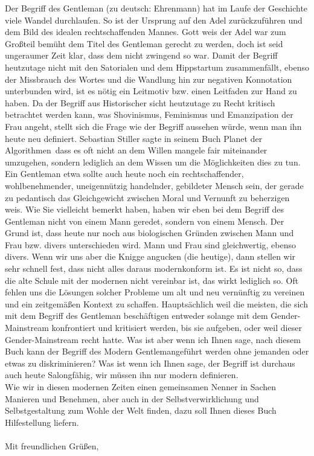 Der Begriff des Gentleman (zu deutsch: Ehrenmann) hat im Laufe der Geschichte viele Wandel durchlaufen. 
So ist der Ursprung auf den Adel zurückzuführen und dem Bild des idealen rechtschaffenden Mannes. 
Gott weis der Adel war zum Großteil bemüht dem Titel des Gentleman gerecht zu werden, doch ist seid ungeraumer Zeit klar, 
dass dem nicht zwingend so war. Damit der Begriff heutzutage nicht mit den Satorialen und dem Hippstartum zusammenfällt,
ebenso der Missbrauch des Wortes und die Wandlung hin zur negativen Konnotation unterbunden wird, ist es nötig ein Leitmotiv bzw. 
einen Leitfaden zur Hand zu haben. Da der Begriff aus Historischer sicht heutzutage zu Recht kritisch betrachtet werden kann, was Shovinismus,
Feminismus und Emanzipation der Frau angeht, stellt sich die Frage wie der Begriff aussehen würde, wenn man ihn heute neu definiert.
Sebastian Stiller sagte in seinem Buch \glqq Planet der Algorithmen\grqq \, dass es oft nicht an dem Willen mangele
fair miteinander umzugehen, sondern lediglich an dem Wissen um die Möglichkeiten dies zu tun.
Ein Gentleman etwa sollte auch heute noch ein rechtschaffender, wohlbenehmender, uneigennützig handelnder, 
gebildeter Mensch sein, der gerade zu pedantisch das Gleichgewicht zwischen Moral und Vernunft zu beherzigen weis.
Wie Sie vielleicht bemerkt haben, haben wir eben bei dem Begriff des Gentleman nicht von einem Mann geredet,
sondern von einem Mensch. Der Grund ist, dass heute nur noch aus biologischen Gründen zwischen Mann und Frau bzw. divers
unterschieden wird. Mann und Frau sind gleichwertig, ebenso divers. Wenn wir uns aber die Knigge angucken (die heutige),
dann stellen wir sehr schnell fest, dass nicht alles daraus modernkonform ist. Es ist nicht so, dass die alte Schule mit
der modernen nicht vereinbar ist, das wirkt lediglich so. Oft fehlen uns die Lösungen solcher Probleme um alt und neu vernünftig
zu vereinen und ein zeitgemäßen Kontext zu schaffen. Hauptsächlich weil die meisten, die sich mit dem Begriff des Gentleman beschäftigen
entweder solange mit dem Gender-Mainstream konfrontiert und kritisiert werden, bis sie aufgeben, oder weil dieser Gender-Mainstream
recht hatte. Was ist aber wenn ich Ihnen sage, nach diesem Buch kann der Begriff des \glqq Modern Gentleman\grqq geführt werden ohne jemanden
oder etwas zu diskriminieren? Was ist wenn ich Ihnen sage, der Begriff ist durchaus auch heute Salongfähig, wir müssen ihn nur modern definieren.
\\
Wie wir in diesen modernen Zeiten einen gemeinsamen Nenner in Sachen Manieren und Benehmen, aber auch in der Selbstverwirklichung
und Selbstgestaltung zum Wohle der Welt finden, dazu soll Ihnen dieses Buch Hilfestellung liefern.
\\
\\
Mit freundlichen Grüßen,\\ 


